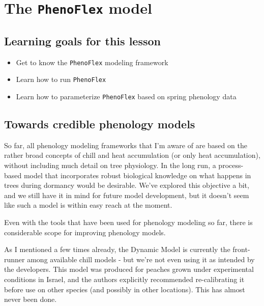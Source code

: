 \documentclass[
]{book}
\providecommand{\tightlist}{%
  \setlength{\itemsep}{0pt}\setlength{\parskip}{0pt}}
\begin{document}
\hypertarget{phenoflex}{%
\chapter{\texorpdfstring{The \texttt{PhenoFlex} model}{The PhenoFlex model}}\label{phenoflex}}

\hypertarget{goals_phenoflex}{%
\section*{Learning goals for this lesson}\label{goals_phenoflex}}

\begin{itemize}
\tightlist
\item
  Get to know the \texttt{PhenoFlex} modeling framework
\item
  Learn how to run \texttt{PhenoFlex}
\item
  Learn how to parameterize \texttt{PhenoFlex} based on spring phenology data
\end{itemize}

\hypertarget{towards-credible-phenology-models}{%
\section{Towards credible phenology models}\label{towards-credible-phenology-models}}

So far, all phenology modeling frameworks that I'm aware of are based on the rather broad concepts of chill and heat accumulation (or only heat accumulation), without including much detail on tree physiology. In the long run, a process-based model that incorporates robust biological knowledge on what happens in trees during dormancy would be desirable. We've explored this objective a bit, and we still have it in mind for future model development, but it doesn't seem like such a model is within easy reach at the moment.

Even with the tools that have been used for phenology modeling so far, there is considerable scope for improving phenology models.

As I mentioned a few times already, the Dynamic Model is currently the front-runner among available chill models - but we're not even using it as intended by the developers. This model was produced for peaches grown under experimental conditions in Israel, and the authors explicitly recommended re-calibrating it before use on other species (and possibly in other locations). This has almost never been done.
\end{document}
